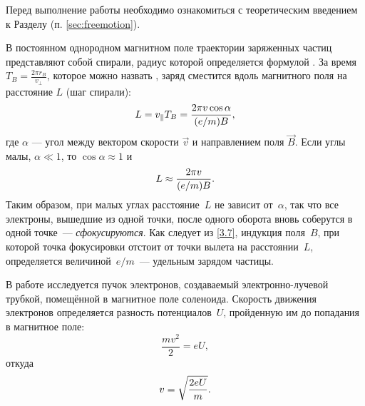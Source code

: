 


Перед выполнение работы необходимо ознакомиться с теоретическим введением
к Разделу (п. \ref{sec:freemotion}).



В постоянном однородном магнитном поле траектории заряженных частиц представляют
собой спирали, радиус которой определяется формулой .
За время $T_B= \frac{2\pi r_B}{v_{\perp}}$, которое можно назвать
, заряд сместится вдоль магнитного поля на 
расстояние $L$ (шаг спирали):
\begin{equation}
    \eqmark{3.6}
    L = v_{\parallel}T_B =\frac{2\pi v\cos\alpha}{(e/m)B},
\end{equation}
где $\alpha$ --- угол между вектором скорости $\vec{v}$ и направлением поля $\vec{B}$.
Если углы малы, $\alpha \ll 1$, то $\cos\alpha \approx 1$ и
\begin{equation}
    \eqmark{3.7}
    L \approx \frac{2\pi v}{(e/m)B}.
\end{equation}
Таким образом, при малых углах расстояние~$L$ не зависит от~$\alpha$, так
что все электроны, вышедшие из одной точки, после одного оборота вновь соберутся
в одной точке~--- \emph{сфокусируются}. Как следует из \eqref{3.7}, 
индукция поля~$B$, при которой точка фокусировки отстоит от точки вылета 
на расстоянии~$L$, определяется величиной~$e/m$~--- удельным зарядом частицы.

В работе исследуется пучок электронов, создаваемый электронно-лучевой трубкой, 
помещённой в магнитное поле соленоида.
Скорость движения электронов определяется разность потенциалов~$U$,
пройденную им до попадания в магнитное поле:
\begin{equation*}
  \frac{mv^2}{2}=eU,
\end{equation*}
откуда
\begin{equation}
  \eqmark{3.3}
  v=\sqrt{\frac{2eU}{m}}.
\end{equation}

